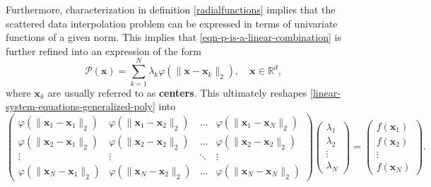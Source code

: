 \documentclass[12pt]{report} %
\newcommand{\tmmathbf}[1]{\ensuremath{\boldsymbol{#1}}}
\begin{document}
Furthermore, characterization in definition \ref{radialfunctions} implies that the scattered data interpolation problem can be expressed in terms of univariate functions of a given norm.
This implies that \eqref{eqn-p-is-a-linear-combination} is further refined into an
expression of the form
\begin{equation}
  \mathcal{P} (\tmmathbf{x}) = \sum_{k = 1}^N \lambda_k \varphi (\|
  \tmmathbf{x}-\tmmathbf{x}_k \|_2), \quad \tmmathbf{x} \in \mathbb{R}^d,
  \label{eqn-p-is-a-linear-combination-of-rbfs}
\end{equation}
where $\tmmathbf{x}_k$ are usually referred to as \textbf{centers}. This ultimately reshapes \eqref{linear-system-equations-generalized-poly} into
\begin{equation}
  \left(\begin{array}{cccc}
    \varphi (\| \tmmathbf{x}_1 -\tmmathbf{x}_1 \|_2) & \varphi (\|
    \tmmathbf{x}_1 -\tmmathbf{x}_2 \|_2) & \ldots & \varphi (\| \tmmathbf{x}_1
    -\tmmathbf{x}_N \|_2)\\
    \varphi (\| \tmmathbf{x}_2 -\tmmathbf{x}_1 \|_2) & \varphi (\|
    \tmmathbf{x}_2 -\tmmathbf{x}_2 \|_2) & \ldots & \varphi (\| \tmmathbf{x}_2
    -\tmmathbf{x}_2 \|_2)\\
    \vdots & \vdots & \ddots & \vdots\\
    \varphi (\| \tmmathbf{x}_N -\tmmathbf{x}_1 \|_2) & \varphi (\|
    \tmmathbf{x}_N -\tmmathbf{x}_2 \|_2) & \ldots & \varphi (\| \tmmathbf{x}_N
    -\tmmathbf{x}_N \|_2)
  \end{array}\right) \left(\begin{array}{c}
    \lambda_1\\
    \lambda_2\\
    \vdots\\
    \lambda_N
  \end{array}\right) = \left(\begin{array}{c}
    f (\tmmathbf{x}_1)\\
    f (\tmmathbf{x}_2)\\
    \vdots\\
    f (\tmmathbf{x}_N)
  \end{array}\right).
  \label{eqn-linear-system-equations-rbf}
\end{equation}
\end{document}
